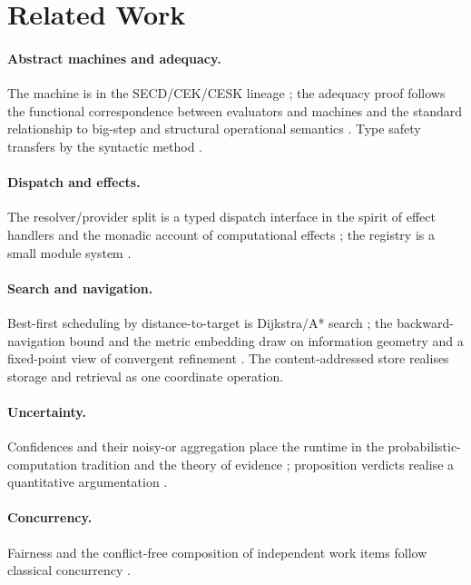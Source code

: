\documentclass[11pt,a4paper]{article}
\theoremstyle{plain}
\theoremstyle{definition}
\theoremstyle{remark}
\begin{document}
\section{Related Work}
\label{sec:related}

\paragraph{Abstract machines and adequacy.} The machine is in the SECD/CEK/CESK
lineage \citep{landin1964,felleisen1992}; the adequacy proof follows the
functional correspondence between evaluators and machines
\citep{ager2003,reynolds1972} and the standard relationship to big-step and
structural operational semantics \citep{kahn1987,plotkin1981,winskel1993}. Type
safety transfers by the syntactic method \citep{wright1994,pierce2002}.

\paragraph{Dispatch and effects.} The resolver/provider split is a typed
dispatch interface in the spirit of effect handlers and the monadic account of
computational effects \citep{moggi1991,wadler1992}; the registry is a small
module system \citep{cardelli1985}.

\paragraph{Search and navigation.} Best-first scheduling by distance-to-target
is Dijkstra/A* search \citep{dijkstra1959,hart1968}; the backward-navigation
bound and the metric embedding draw on information geometry
\citep{amari2016,cencov1982} and a fixed-point view of convergent refinement
\citep{banach1922}. The content-addressed store realises storage and retrieval
as one coordinate operation.

\paragraph{Uncertainty.} Confidences and their noisy-or aggregation place the
runtime in the probabilistic-computation tradition \citep{kozen1981,mciver2005}
and the theory of evidence \citep{shafer1976}; proposition verdicts realise a
quantitative argumentation \citep{dung1995}.

\paragraph{Concurrency.} Fairness and the conflict-free composition of
independent work items follow classical concurrency \citep{dijkstra1968,
lamport1978}.
\end{document}
